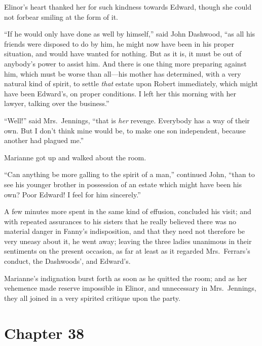 Elinor's heart thanked her for such kindness towards Edward,
though she could not forbear smiling at the form of it.

``If he would only have done as well by himself,''
said John Dashwood, ``as all his friends were disposed to do
by him, he might now have been in his proper situation,
and would have wanted for nothing.  But as it is, it must
be out of anybody's power to assist him.  And there is one
thing more preparing against him, which must be worse than
all---his mother has determined, with a very natural kind
of spirit, to settle \emph{that} estate upon Robert immediately,
which might have been Edward's, on proper conditions.
I left her this morning with her lawyer, talking over
the business.''

``Well!'' said Mrs.\ Jennings, ``that is \emph{her} revenge.
Everybody has a way of their own.  But I don't think mine
would be, to make one son independent, because another had
plagued me.''

Marianne got up and walked about the room.

``Can anything be more galling to the spirit of a man,''
continued John, ``than to see his younger brother in
possession of an estate which might have been his own?
Poor Edward!  I feel for him sincerely.''

A few minutes more spent in the same kind of effusion,
concluded his visit; and with repeated assurances to his
sisters that he really believed there was no material
danger in Fanny's indisposition, and that they need
not therefore be very uneasy about it, he went away;
leaving the three ladies unanimous in their sentiments
on the present occasion, as far at least as it regarded
Mrs.\ Ferrars's conduct, the Dashwoods', and Edward's.

Marianne's indignation burst forth as soon as he
quitted the room; and as her vehemence made reserve
impossible in Elinor, and unnecessary in Mrs.\ Jennings,
they all joined in a very spirited critique upon the party.



\chapter{Chapter 38}


